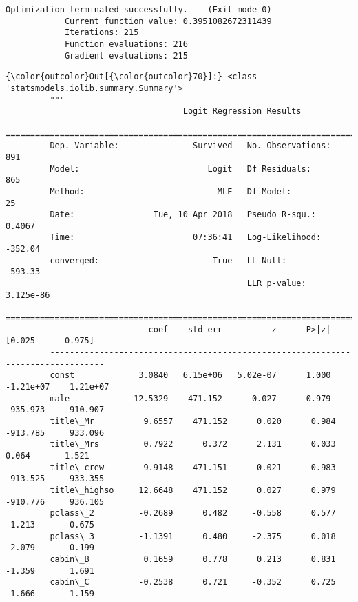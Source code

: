 \documentclass[11pt]{article}
\begin{document}
    \begin{Verbatim}[commandchars=\\\{\}]
Optimization terminated successfully.    (Exit mode 0)
            Current function value: 0.3951082672311439
            Iterations: 215
            Function evaluations: 216
            Gradient evaluations: 215

    \end{Verbatim}

\begin{Verbatim}[commandchars=\\\{\}]
{\color{outcolor}Out[{\color{outcolor}70}]:} <class 'statsmodels.iolib.summary.Summary'>
         """
                                    Logit Regression Results                           
         ==============================================================================
         Dep. Variable:               Survived   No. Observations:                  891
         Model:                          Logit   Df Residuals:                      865
         Method:                           MLE   Df Model:                           25
         Date:                Tue, 10 Apr 2018   Pseudo R-squ.:                  0.4067
         Time:                        07:36:41   Log-Likelihood:                -352.04
         converged:                       True   LL-Null:                       -593.33
                                                 LLR p-value:                 3.125e-86
         =================================================================================
                             coef    std err          z      P>|z|      [0.025      0.975]
         ---------------------------------------------------------------------------------
         const             3.0840   6.15e+06   5.02e-07      1.000   -1.21e+07    1.21e+07
         male            -12.5329    471.152     -0.027      0.979    -935.973     910.907
         title\_Mr          9.6557    471.152      0.020      0.984    -913.785     933.096
         title\_Mrs         0.7922      0.372      2.131      0.033       0.064       1.521
         title\_crew        9.9148    471.151      0.021      0.983    -913.525     933.355
         title\_highso     12.6648    471.152      0.027      0.979    -910.776     936.105
         pclass\_2         -0.2689      0.482     -0.558      0.577      -1.213       0.675
         pclass\_3         -1.1391      0.480     -2.375      0.018      -2.079      -0.199
         cabin\_B           0.1659      0.778      0.213      0.831      -1.359       1.691
         cabin\_C          -0.2538      0.721     -0.352      0.725      -1.666       1.159

\end{Verbatim}
\end{document}
